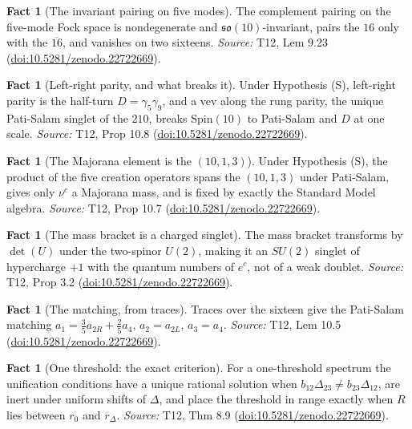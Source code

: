 \documentclass[11pt]{article}
\theoremstyle{definition}
\newtheorem{fact}[theorem]{Fact}
\theoremstyle{plain}
\providecommand{\Dl}{}\renewcommand{\Dl}{\Delta}
\providecommand{\so}{}\renewcommand{\so}{\mathfrak{so}}
\begin{document}
\begin{fact}[The invariant pairing on five modes]\label{c:standard-model.invariant-pairing-five-modes}
The complement pairing on the five-mode Fock space is nondegenerate and $\so(10)$-invariant, pairs the $16$ only with the $\overline{16}$, and vanishes on two sixteens.
\emph{Source:} T12, Lem 9.23 (\href{https://doi.org/10.5281/zenodo.22722669}{doi:10.5281/zenodo.22722669}).
\end{fact}

\begin{fact}[Left-right parity, and what breaks it]\label{c:standard-model.left-right-parity-what-breaks-it}
Under Hypothesis (S), left-right parity is the half-turn $D = \gamma_{5}\gamma_{9}$, and a vev along the rung parity, the unique Pati-Salam singlet of the $210$, breaks $\mathrm{Spin}(10)$ to Pati-Salam and $D$ at one scale.
\emph{Source:} T12, Prop 10.8 (\href{https://doi.org/10.5281/zenodo.22722669}{doi:10.5281/zenodo.22722669}).
\end{fact}

\begin{fact}[The Majorana element is the $(10,1,3)$]\label{c:standard-model.majorana-element}
Under Hypothesis (S), the product of the five creation operators spans the $(10,1,3)$ under Pati-Salam, gives only $\nu^{c}$ a Majorana mass, and is fixed by exactly the Standard Model algebra.
\emph{Source:} T12, Prop 10.7 (\href{https://doi.org/10.5281/zenodo.22722669}{doi:10.5281/zenodo.22722669}).
\end{fact}

\begin{fact}[The mass bracket is a charged singlet]\label{c:standard-model.mass-bracket-charged-singlet}
The mass bracket transforms by $\det(U)$ under the two-spinor $U(2)$, making it an $SU(2)$ singlet of hypercharge $+1$ with the quantum numbers of $e^{c}$, not of a weak doublet.
\emph{Source:} T12, Prop 3.2 (\href{https://doi.org/10.5281/zenodo.22722669}{doi:10.5281/zenodo.22722669}).
\end{fact}

\begin{fact}[The matching, from traces]\label{c:standard-model.matching-traces}
Traces over the sixteen give the Pati-Salam matching $a_{1} = \tfrac35 a_{2R} + \tfrac25 a_{4}$, $a_{2} = a_{2L}$, $a_{3} = a_{4}$.
\emph{Source:} T12, Lem 10.5 (\href{https://doi.org/10.5281/zenodo.22722669}{doi:10.5281/zenodo.22722669}).
\end{fact}

\begin{fact}[One threshold: the exact criterion]\label{c:standard-model.one-threshold-exact-criterion}
For a one-threshold spectrum the unification conditions have a unique rational solution when $b_{12}\Dl_{23} \ne b_{23}\Dl_{12}$, are inert under uniform shifts of $\Dl$, and place the threshold in range exactly when $R$ lies between $r_{0}$ and $r_{\Dl}$.
\emph{Source:} T12, Thm 8.9 (\href{https://doi.org/10.5281/zenodo.22722669}{doi:10.5281/zenodo.22722669}).
\end{fact}
\end{document}
